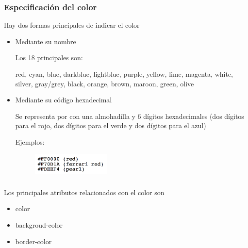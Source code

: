 \documentclass[ucs]{beamer}
\begin{document}

\begin{frame}
\frametitle{Especificación del color}
Hay dos formas principales de indicar el color

\begin{itemize}
\item 
Mediante su nombre

Los 18 principales son:

red, cyan, blue, darkblue, lightblue, purple, yellow,
lime, magenta, white, silver, gray/grey, black,
orange, brown, maroon, green, olive

  \item 
Mediante su código hexadecimal

Se representa por con una almohadilla y 6 dígitos hexadecimales
(dos dígitos para el rojo,
dos dígitos para el verde y 
dos dígitos para el azul)

Ejemplos:

\begin{flushleft}
\begin{figure}[p]
\includegraphics[width=0.37\textwidth]{figs/colores}
\end{figure}
\end{flushleft}

\end{itemize}

\end{frame}



\begin{frame}[fragile]
\frametitle{}
Los principales atributos relacionados con el color son
\begin{itemize}
\item
color

\item
backgroud-color

\item
border-color

\end{itemize}

\end{frame}
\end{document}
